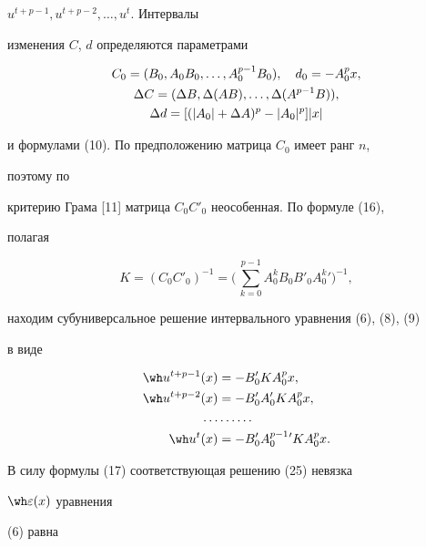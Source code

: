 $u^{t+p-1},u^{t+p-2},\dotsc,u^t$. Интервалы 


изменения $C$, $d$ определяются параметрами 


\begin{gather} 


C_0=(B_0,A_0B_0,\dotsc,A^{p-1}_0B_0),\quad d_0=-A^p_0x,\notag\\ 


\Delta C=(\Delta B,\Delta(AB),\dotsc,\Delta(A^{p-1}B)),\\ 


\Delta d=[(|A_0|+\Delta A)^p-|A_0|^p]|x|\notag 


\end{gather} 


и формулами (10). По предположению матрица $C_0$ имеет ранг $n$, 


поэтому по 


критерию Грама [11] матрица $C_0C'_0$ неособенная. По формуле (16), 


полагая 


\begin{equation} 


K=(C_0C'_0)^{-1}=\bigg(\,\sum^{p-1}_{k=0} 


A^k_0B_0B'_0A^k_0{}'\bigg)^{-1}, 


\end{equation} 


находим субуниверсальное решение интервального уравнения (6), (8), (9) 


в виде 


\begin{equation} 


\begin{split} 


\wh u^{t+p-1}(x)&=-B'_0K A^p_0x,\\ 


\wh u^{t+p-2}(x)&=-B'_0A'_0K A^p_0x,\\ 


\dotsc&\dotsc\dotsc\\ 


\wh u^t(x)&=-B'_0A^{p-1}_0{}' K A^p_0x. 


\end{split} 


\end{equation} 


В силу формулы (17) соответствующая решению (25) невязка 


$\wh\varepsilon(x)$ уравнения 


(6) равна 


